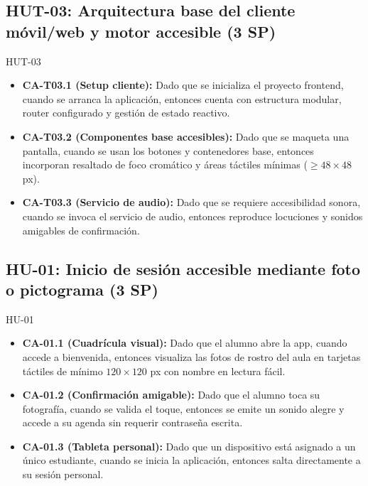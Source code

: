 \documentclass[11pt,a4paper]{article}
\newcommand{\ca}[2]{\item \textbf{#1:} #2}
\begin{document}
\subsection{HUT-03: Arquitectura base del cliente móvil/web y motor accesible (3 SP)}
\begin{criterios}{HUT-03}
\begin{itemize}
\ca{CA-T03.1 (Setup cliente)}{Dado que se inicializa el proyecto frontend, cuando se arranca la aplicación, entonces cuenta con estructura modular, router configurado y gestión de estado reactivo.}
\ca{CA-T03.2 (Componentes base accesibles)}{Dado que se maqueta una pantalla, cuando se usan los botones y contenedores base, entonces incorporan resaltado de foco cromático y áreas táctiles mínimas ($\geq 48 \times 48$ px).}
\ca{CA-T03.3 (Servicio de audio)}{Dado que se requiere accesibilidad sonora, cuando se invoca el servicio de audio, entonces reproduce locuciones y sonidos amigables de confirmación.}
\end{itemize}
\end{criterios}

\subsection{HU-01: Inicio de sesión accesible mediante foto o pictograma (3 SP)}
\begin{criterios}{HU-01}
\begin{itemize}
\ca{CA-01.1 (Cuadrícula visual)}{Dado que el alumno abre la app, cuando accede a bienvenida, entonces visualiza las fotos de rostro del aula en tarjetas táctiles de mínimo $120 \times 120$ px con nombre en lectura fácil.}
\ca{CA-01.2 (Confirmación amigable)}{Dado que el alumno toca su fotografía, cuando se valida el toque, entonces se emite un sonido alegre y accede a su agenda sin requerir contraseña escrita.}
\ca{CA-01.3 (Tableta personal)}{Dado que un dispositivo está asignado a un único estudiante, cuando se inicia la aplicación, entonces salta directamente a su sesión personal.}
\end{itemize}
\end{criterios}
\end{document}
